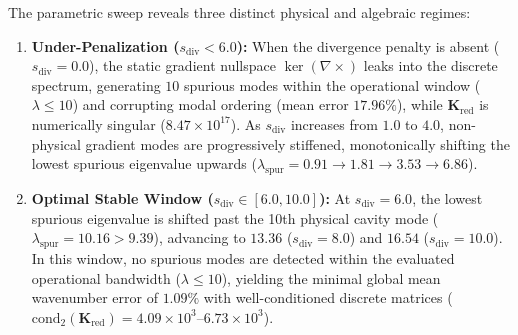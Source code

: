 \documentclass[preprint,12pt]{elsarticle}
\begin{document}
The parametric sweep reveals three distinct physical and algebraic regimes:
\begin{enumerate}
    \item \textbf{Under-Penalization ($s_{\mathrm{div}} < 6.0$):} When the divergence penalty is absent ($s_{\mathrm{div}} = 0.0$), the static gradient nullspace $\ker(\nabla \times)$ leaks into the discrete spectrum, generating $10$ spurious modes within the operational window ($\lambda \le 10$) and corrupting modal ordering (mean error $17.96\%$), while $\mathbf{K}_{\mathrm{red}}$ is numerically singular ($8.47 \times 10^{17}$). As $s_{\mathrm{div}}$ increases from $1.0$ to $4.0$, non-physical gradient modes are progressively stiffened, monotonically shifting the lowest spurious eigenvalue upwards ($\lambda_{\mathrm{spur}} = 0.91 \to 1.81 \to 3.53 \to 6.86$).
    \item \textbf{Optimal Stable Window ($s_{\mathrm{div}} \in [6.0, 10.0]$):} At $s_{\mathrm{div}} = 6.0$, the lowest spurious eigenvalue is shifted past the 10th physical cavity mode ($\lambda_{\mathrm{spur}} = 10.16 > 9.39$), advancing to $13.36$ ($s_{\mathrm{div}} = 8.0$) and $16.54$ ($s_{\mathrm{div}} = 10.0$). In this window, no spurious modes are detected within the evaluated operational bandwidth ($\lambda \le 10$), yielding the minimal global mean wavenumber error of $1.09\%$ with well-conditioned discrete matrices ($\mathrm{cond}_2(\mathbf{K}_{\mathrm{red}}) = 4.09 \times 10^3 \text{--} 6.73 \times 10^3$).


\end{enumerate}
\end{document}
